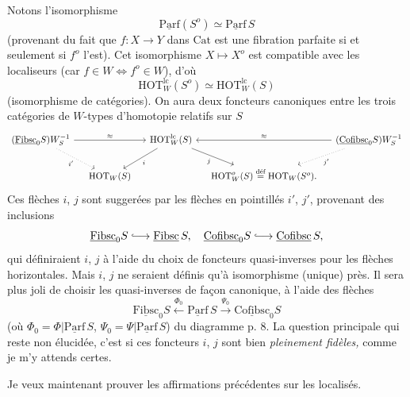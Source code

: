 \documentclass[11pt]{article}
\newcommand{\printedpage}[1]{\marginpar{\footnotesize p.~#1}}
\newcommand{\msp}[1]{\marginpar{\footnotesize [#1]}}
\newcommand{\uc}[1]{\underline{\mathrm{#1}}}
\newcommand{\HOT}{\mathrm{HOT}}
\newcommand{\Cat}{\mathrm{Cat}}
\newcommand{\defeq}{\overset{\text{déf}}{=}}
\begin{document}
\msp{page 51}

Notons l'isomorphisme
\[
\uc{Parf}(S^o) \simeq \uc{Parf}\,S
\]
(provenant du fait que $f : X \longrightarrow Y$ dans $\Cat$ est une fibration parfaite si et seulement si $f^o$ l'est). Cet isomorphisme $X \longmapsto X^o$ est compatible avec les localiseurs (car $f \in W \Longleftrightarrow f^o \in W$), d'où
\[
\HOT^{\mathrm{lc}}_W(S^o) \simeq \HOT^{\mathrm{lc}}_W(S)
\]
(isomorphisme de catégories). On aura deux foncteurs canoniques entre les trois catégories de $W$-types d'homotopie relatifs sur $S$
\[
\begin{tikzcd}[column sep=small]
(\uc{Fibsc}_0S)W_S^{-1} \arrow[rr, "\approx"] \arrow[dr, dotted, "i'"'] & & \HOT^{\mathrm{lc}}_W(S) \arrow[dl, "i"] \arrow[dr, "j"'] & & (\uc{Cofibsc}_0S)W_S^{-1} \arrow[ll, "\approx"'] \arrow[dl, dotted, "j'"] \\
& \HOT_W(S) & & \HOT^o_W(S) \defeq \HOT_W(S^o). &
\end{tikzcd}
\]
\printedpage{32}
 Ces flèches $i$, $j$ sont suggerées par les flèches en pointillés $i'$, $j'$, provenant des inclusions %
\[
\uc{Fibsc}_0S \lhook\joinrel\longrightarrow \uc{Fibsc}\,S,\quad \uc{Cofibsc}_0S \lhook\joinrel\longrightarrow \uc{Cofibsc}\,S,
\]
qui définiraient $i$, $j$ à l'aide du choix de foncteurs quasi-inverses pour les flèches horizontales. Mais $i$, $j$ ne seraient définis qu'à isomorphisme (unique) près. Il sera plus joli de choisir les quasi-inverses de façon canonique, à l'aide des flèches
\[
\uc{Fibsc}_0S \xleftarrow{\Phi_0} \uc{Parf}\,S \xrightarrow{\Psi_0} \uc{Cofibsc}_0S
\]
(où $\Phi_0 = \Phi|\uc{Parf}\,S$, $\Psi_0 = \Psi|\uc{Parf}\,S$) du diagramme p. 8. La question principale
\msp{page 52}
qui reste non élucidée, c'est si ces foncteurs $i$, $j$ sont bien \textit{pleinement fidèles,} comme je m'y attends certes.

Je veux maintenant prouver les affirmations précédentes sur les localisés.
\end{document}
